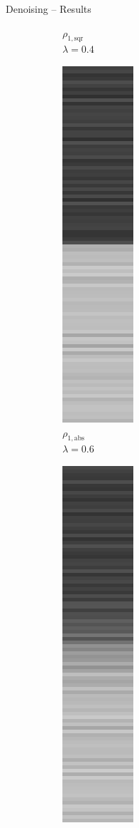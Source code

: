 \documentclass[t]{beamer}
\begin{document}
\begin{frame}{Denoising -- Results}
\begin{figure}[t]
\begin{subfigure}[t]{0.08\textwidth}
				\tiny $\rho_{1,\text{sqr}}$\\[2px]
				\tiny $\lambda = 0.4$
			\end{subfigure}
			\begin{subfigure}[t]{0.08\textwidth}
				\includegraphics[scale=0.25]{../paper/pictures/denoising/signal/ipiano_absolute_06.png}\\
				\tiny $\rho_{1,\text{abs}}$\\[2px]
				\tiny $\lambda = 0.6$
			\end{subfigure}
			\begin{subfigure}[t]{0.08\textwidth}
				\includegraphics[scale=0.25]{../paper/pictures/denoising/signal/ipiano_squared_06.png}\\

\end{subfigure}
\end{figure}
\end{frame}
\end{document}
